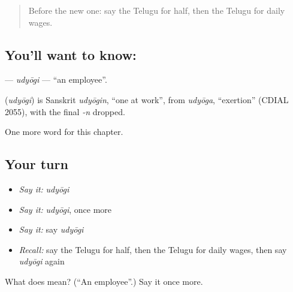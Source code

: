 \label{lesson:TE-C310-udyogi}



\begin{quote}
Before the new one: say the Telugu for half, then the Telugu for daily wages.
\end{quote}

\subsection*{You'll want to know: }
\textbf{} — \emph{udyōgi} — \textquotedblleft{}an employee\textquotedblright{}.

\begin{cousinweb}
\textbf{} (\emph{udyōgi}) is Sanskrit \emph{udyōgin}, \textquotedblleft{}one at work\textquotedblright{}, from \emph{udyōga}, \textquotedblleft{}exertion\textquotedblright{} (CDIAL 2055), with the final \emph{-n} dropped.
\end{cousinweb}

\begin{grammarlens}[title={What you've built}]
One more word for this chapter.
\end{grammarlens}

\subsection*{Your turn}
\begin{itemize}
\raggedright
  \item \emph{Say it:} \emph{udyōgi}
  \item \emph{Say it:} \emph{udyōgi}, once more
  \item \emph{Say it:} say \emph{udyōgi}
  \item \emph{Recall:} say the Telugu for half, then the Telugu for daily wages, then say \emph{udyōgi} again
\end{itemize}

\begin{tcolorbox}[breakable,colback=teal!4,colframe=teal!35!black,title={Before you move on}]
What does  mean? (\textquotedblleft{}An employee\textquotedblright{}.) Say it once more.
\end{tcolorbox}
